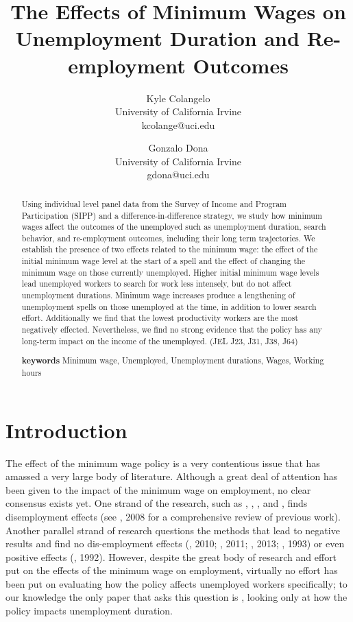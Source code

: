 \documentclass{article}
\title{The Effects of Minimum Wages on Unemployment Duration and Re-employment Outcomes}
\author{Kyle Colangelo\\University of California Irvine\\kcolange@uci.edu
		\and
		Gonzalo Dona\\University of California Irvine\\gdona@uci.edu}
\begin{document}
\maketitle
\begin{abstract}
	Using individual level panel data from the Survey of Income and Program Participation (SIPP) and a difference-in-difference strategy, we study how minimum wages affect the outcomes of the unemployed such as unemployment duration, search behavior, and re-employment outcomes, including their long term trajectories. We establish the presence of two effects related to the minimum wage: the effect of the initial minimum wage level at the start of a spell and the effect of changing the minimum wage on those currently unemployed. Higher initial minimum wage levels lead unemployed workers to search for work less intensely, but do not affect unemployment durations. Minimum wage increases produce a lengthening of unemployment spells on those unemployed at the time, in addition to lower search effort. Additionally we find that the lowest productivity workers are the most negatively effected. Nevertheless, we find no strong evidence that the policy has any long-term impact on the income of the unemployed. (JEL J23, J31, J38, J64)
	
	\textbf{keywords} Minimum wage, Unemployed, Unemployment durations, Wages, Working hours
\end{abstract}

\newpage
\section{Introduction}

The effect of the minimum wage policy is a very contentious issue that has amassed a very large body of literature. Although a great deal of attention has been given to the impact of the minimum wage on employment, no clear consensus exists yet. One strand of the research, such as \cite{powell2017synthetic}, \cite{meer2016effects}, \cite{thompson2009using}, and \cite{neumark2004minimum}, finds disemployment effects (see \citeauthor{neumark2008minimum}, 2008 for a comprehensive review of previous work). Another parallel strand of research questions the methods that lead to negative results and find no dis-employment effects (\citeauthor{dube2010minimum}, 2010; \citeauthor{allegretto2011minimum}, 2011; \citeauthor{giuliano2013minimum}, 2013; \citeauthor{card1993minimum}, 1993) or even positive effects (\citeauthor{card1992minimum}, 1992). However, despite the great body of research and effort put on the effects of the minimum wage on employment, virtually no effort has been put on evaluating how the policy affects unemployed workers specifically; to our knowledge the only paper that asks this question is \cite{pedace2011impact}, looking only at how the policy impacts unemployment duration.
\end{document}
